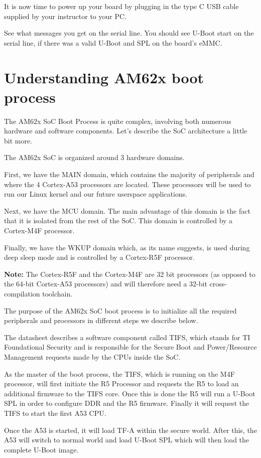 It is now time to power up your board by plugging in the type C USB
cable supplied by your instructor to your PC.

See what messages you get on the serial line. You should see U-Boot
start on the serial line, if there was a valid U-Boot and SPL on the
board's eMMC.

\section{Understanding AM62x boot process}

The AM62x SoC Boot Process is quite complex, involving both numerous
hardware and software components.
Let's describe the SoC architecture a little bit more.

The AM62x SoC is organized around 3 hardware domains.

First, we have the MAIN domain, which contains the majority of peripherals and
where the 4 Cortex-A53 processors are located. These processors will be used to
run our Linux kernel and our future userspace applications.

Next, we have the MCU domain. The main advantage of this domain is the
fact that it is isolated from the rest of the SoC. This domain is
controlled by a Cortex-M4F processor.

Finally, we have the WKUP domain which, as its name suggests, is used during
deep sleep mode and is controlled by a Cortex-R5F processor.

\textbf{Note:} The Cortex-R5F and the Cortex-M4F are 32 bit processors
(as opposed to the 64-bit Cortex-A53 processors) and will therefore need
a 32-bit cross-compilation toolchain.

The purpose of the AM62x SoC boot process is to initialize all the required
peripherals and processors in different steps we describe below.

The datasheet describes a software component called TIFS, which stands for
TI Foundational Security and is responsible for the Secure
Boot and Power/Resource Management requests made by the CPUs inside the SoC.

As the master of the boot process, the TIFS, which is running on the
M4F processor, will first initiate the R5 Processor and requests the
R5 to load an additional firmware to the TIFS core. Once this is done the
R5 will run a U-Boot SPL in order to configure DDR and the R5
firmware. Finally it will request the TIFS to start the first A53 CPU.

Once the A53 is started, it will load TF-A within the secure world.
After this, the A53 will switch to normal world and load U-Boot SPL which
will then load the complete U-Boot image.


